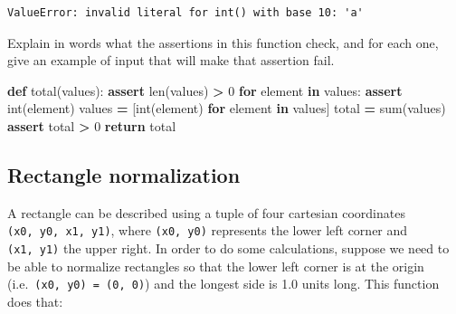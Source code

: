 \documentclass[
]{krantz}
\makeatletter
\newenvironment{Shaded}{\begin{snugshade}}{\end{snugshade}}
\newcommand{\BuiltInTok}[1]{#1}
\newcommand{\ControlFlowTok}[1]{\textcolor[rgb]{0.13,0.29,0.53}{\textbf{#1}}}
\newcommand{\DecValTok}[1]{\textcolor[rgb]{0.00,0.00,0.81}{#1}}
\newcommand{\KeywordTok}[1]{\textcolor[rgb]{0.13,0.29,0.53}{\textbf{#1}}}
\newcommand{\NormalTok}[1]{#1}
\newcommand{\OperatorTok}[1]{\textcolor[rgb]{0.81,0.36,0.00}{\textbf{#1}}}
\newenvironment{kframe}{%
\medskip{}
\setlength{\fboxsep}{.8em}
 \def\at@end@of@kframe{}%
 \ifinner\ifhmode%
  \def\at@end@of@kframe{\end{minipage}}%
  \begin{minipage}{\columnwidth}%
 \fi\fi%
 \def\FrameCommand##1{\hskip\@totalleftmargin \hskip-\fboxsep
 \colorbox{shadecolor}{##1}\hskip-\fboxsep
     \hskip-\linewidth \hskip-\@totalleftmargin \hskip\columnwidth}%
 \MakeFramed {\advance\hsize-\width
   \@totalleftmargin\z@ \linewidth\hsize
   \@setminipage}}%
 {\par\unskip\endMakeFramed%
 \at@end@of@kframe}
\renewenvironment{Shaded}{\begin{kframe}}{\end{kframe}}
\makeatother
\begin{document}
\begin{verbatim}
ValueError: invalid literal for int() with base 10: 'a'
\end{verbatim}

Explain in words what the assertions in this function check,
and for each one,
give an example of input that will make that assertion fail.

\begin{Shaded}
\begin{Highlighting}[]
\KeywordTok{def}\NormalTok{ total(values):}
    \ControlFlowTok{assert} \BuiltInTok{len}\NormalTok{(values) }\OperatorTok{\textgreater{}} \DecValTok{0}
    \ControlFlowTok{for}\NormalTok{ element }\KeywordTok{in}\NormalTok{ values:}
        \ControlFlowTok{assert} \BuiltInTok{int}\NormalTok{(element)}
\NormalTok{    values }\OperatorTok{=}\NormalTok{ [}\BuiltInTok{int}\NormalTok{(element) }\ControlFlowTok{for}\NormalTok{ element }\KeywordTok{in}\NormalTok{ values]}
\NormalTok{    total }\OperatorTok{=} \BuiltInTok{sum}\NormalTok{(values)}
    \ControlFlowTok{assert}\NormalTok{ total }\OperatorTok{\textgreater{}} \DecValTok{0}
    \ControlFlowTok{return}\NormalTok{ total}
\end{Highlighting}
\end{Shaded}

\hypertarget{testing-ex-rectangles}{%
\subsection{Rectangle normalization}\label{testing-ex-rectangles}}

A rectangle can be described using a tuple of four cartesian coordinates \texttt{(x0,\ y0,\ x1,\ y1)},
where \texttt{(x0,\ y0)} represents the lower left corner and \texttt{(x1,\ y1)} the upper right.
In order to do some calculations,
suppose we need to be able to normalize rectangles so that the lower left corner
is at the origin (i.e.~\texttt{(x0,\ y0)\ =\ (0,\ 0)}) and the longest side is 1.0 units long.
This function does that:
\end{document}
